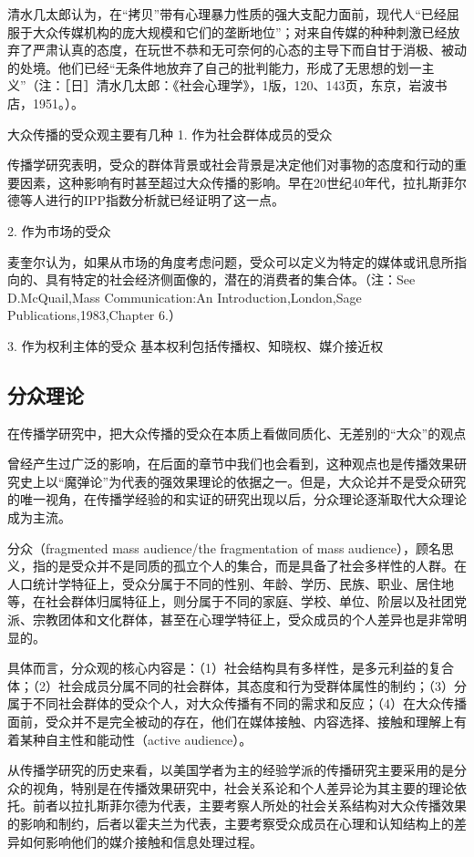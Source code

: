 \documentclass[UTF8,12pt]{ctexart}
\numberwithin{equation}{section} %
\numberwithin{figure}{section}
\numberwithin{table}{section}
\begin{document}
	清水几太郎认为，在“拷贝”带有心理暴力性质的强大支配力面前，现代人“已经屈服于大众传媒机构的庞大规模和它们的垄断地位”；对来自传媒的种种刺激已经放弃了严肃认真的态度，在玩世不恭和无可奈何的心态的主导下而自甘于消极、被动的处境。他们已经“无条件地放弃了自己的批判能力，形成了无思想的划一主义”（注：［日］清水几太郎：《社会心理学》，1版，120、143页，东京，岩波书店，1951。）。
	
	大众传播的受众观主要有几种
	1. 作为社会群体成员的受众
	
	传播学研究表明，受众的群体背景或社会背景是决定他们对事物的态度和行动的重要因素，这种影响有时甚至超过大众传播的影响。早在20世纪40年代，拉扎斯菲尔德等人进行的IPP指数分析就已经证明了这一点。
	
	2. 作为市场的受众
	
	麦奎尔认为，如果从市场的角度考虑问题，受众可以定义为特定的媒体或讯息所指向的、具有特定的社会经济侧面像的，潜在的消费者的集合体。（注：See D.McQuail,Mass Communication:An Introduction,London,Sage Publications,1983,Chapter 6.）
	
	3. 作为权利主体的受众
	基本权利包括传播权、知晓权、媒介接近权
	
	
	\subsection{分众理论}
	在传播学研究中，把大众传播的受众在本质上看做同质化、无差别的“大众”的观点
	
	曾经产生过广泛的影响，在后面的章节中我们也会看到，这种观点也是传播效果研究史上以“魔弹论”为代表的强效果理论的依据之一。但是，大众论并不是受众研究的唯一视角，在传播学经验的和实证的研究出现以后，分众理论逐渐取代大众理论成为主流。
	
	分众（fragmented mass audience/the fragmentation of mass audience），顾名思义，指的是受众并不是同质的孤立个人的集合，而是具备了社会多样性的人群。在人口统计学特征上，受众分属于不同的性别、年龄、学历、民族、职业、居住地等，在社会群体归属特征上，则分属于不同的家庭、学校、单位、阶层以及社团党派、宗教团体和文化群体，甚至在心理学特征上，受众成员的个人差异也是非常明显的。
	
	具体而言，分众观的核心内容是：（1）社会结构具有多样性，是多元利益的复合体；（2）社会成员分属不同的社会群体，其态度和行为受群体属性的制约；（3）分属于不同社会群体的受众个人，对大众传播有不同的需求和反应；（4）在大众传播面前，受众并不是完全被动的存在，他们在媒体接触、内容选择、接触和理解上有着某种自主性和能动性（active audience）。
	
	从传播学研究的历史来看，以美国学者为主的经验学派的传播研究主要采用的是分众的视角，特别是在传播效果研究中，社会关系论和个人差异论为其主要的理论依托。前者以拉扎斯菲尔德为代表，主要考察人所处的社会关系结构对大众传播效果的影响和制约，后者以霍夫兰为代表，主要考察受众成员在心理和认知结构上的差异如何影响他们的媒介接触和信息处理过程。
	
\end{document}
